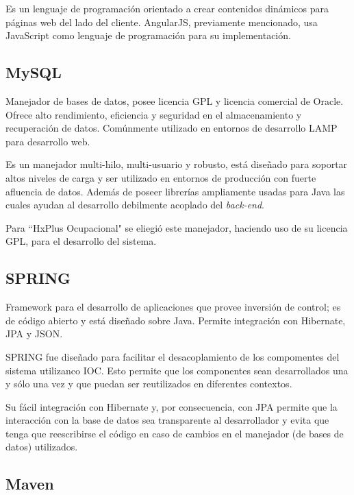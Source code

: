         Es un lenguaje de programación orientado a crear contenidos dinámicos para páginas web del lado del cliente. AngularJS, previamente mencionado, usa JavaScript como lenguaje de programación para su implementación.
        
        \subsection{MySQL}
        \label{tecno-mysql}
        
        Manejador de bases de datos, posee licencia GPL y licencia comercial de Oracle\cite{MYSQL-referencemanual}. Ofrece alto rendimiento, eficiencia y seguridad en el almacenamiento y recuperación de datos\cite{MYSQL-oracle}. Comúnmente utilizado en entornos de desarrollo LAMP para desarrollo web.
        
        Es un manejador multi-hilo, multi-usuario y robusto, está diseñado para soportar altos niveles de carga y ser utilizado en entornos de producción con fuerte afluencia de datos. Además de poseer librerías ampliamente usadas para Java las cuales ayudan al desarrollo debilmente acoplado del \textit{back-end}.
        
        Para ``HxPlus Ocupacional" se eliegió este manejador, haciendo uso de su licencia GPL, para el desarrollo del sistema.
        
        \subsection{SPRING}
        \label{tecno-spring}
        
        Framework para el desarrollo de aplicaciones que provee inversión de control; es de código abierto y está diseñado sobre Java. Permite integración con Hibernate, JPA y JSON\cite{SPRING-essential}.
        
        SPRING fue diseñado para facilitar el desacoplamiento de los compomentes del sistema utilizanco IOC. Esto permite que los componentes sean desarrollados una y sólo una vez y que puedan ser reutilizados en diferentes contextos\cite{SPRING-referencedoc}.
        
        Su fácil integración con Hibernate y, por consecuencia, con JPA permite que la interacción con la base de datos sea transparente al desarrollador y evita que tenga que reescribirse el código en caso de cambios en el manejador (de bases de datos) utilizados.
        
        
        \subsection{Maven}
        \label{tecno-maven}
        
